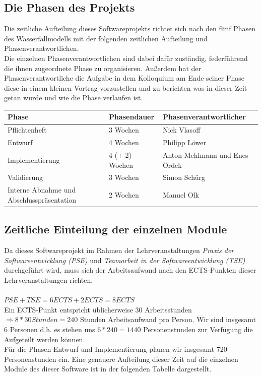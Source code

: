 \documentclass[10pt,a4paper]{article}
\begin{document}
\subsection{Die Phasen des Projekts}
Die zeitliche Aufteilung dieses Softwareprojekts richtet sich nach den fünf Phasen des Wasserfallmodells mit der folgenden zeitlichen Aufteilung und Phasenverantwortlichen.\\
Die einzelnen Phasenverantwortlichen sind dabei dafür zuständig, federführend die ihnen zugeordnete Phase zu organisieren. Außerdem hat der Phasenverantwortliche die Aufgabe in dem Kolloquium am Ende seiner Phase diese in einem kleinen Vortrag vorzustellen und zu berichten was in dieser Zeit getan wurde und wie die Phase verlaufen ist.\\

\begin{tabular}[h]{lll}
	\hline
	\textbf{Phase} & \textbf{Phasendauer} & \textbf{Phasenverantwortlicher} \\
	\hline
	Pflichtenheft & 3 Wochen & Nick Vlasoff \\
	Entwurf & 4 Wochen & Philipp Löwer \\
	Implementierung & 4 (+ 2) Wochen & Anton Mehlmann und Enes Ördek \\
	Validierung & 3 Wochen & Simon Schürg \\
	Interne Abnahme und Abschlusspräsentation & 2 Wochen & Manuel Olk \\
	\hline
\end{tabular}

\subsection{Zeitliche Einteilung der einzelnen Module}
Da dieses Softwareprojekt im Rahmen der Lehrveranstaltungen \textit{Praxis der Softwareentwicklung (PSE)} und \textit{Teamarbeit in der Softwareentwicklung (TSE)} durchgeführt wird, muss sich der Arbeitsaufwand nach den ECTS-Punkten dieser Lehrveranstaltungen richten.\\\\
$PSE + TSE = 6 ECTS + 2 ECTS = 8 ECTS$\\
Ein ECTS-Punkt entspricht üblicherweise 30 Arbeitsstunden $\Rightarrow 8 * 30 Stunden = 240$ Stunden Arbeitsaufwand pro Person. Wir sind insgesamt 6 Personen d.h. es stehen uns $6 * 240 = 1440$ Personenstunden zur Verfügung die Aufgeteilt werden können.\\
Für die Phasen Entwurf und Implementierung planen wir insgesamt 720 Personenstunden ein. Eine genauere Aufteilung dieser Zeit auf die einzelnen Module des dieser Software ist in der folgenden Tabelle dargestellt.\\
\end{document}
